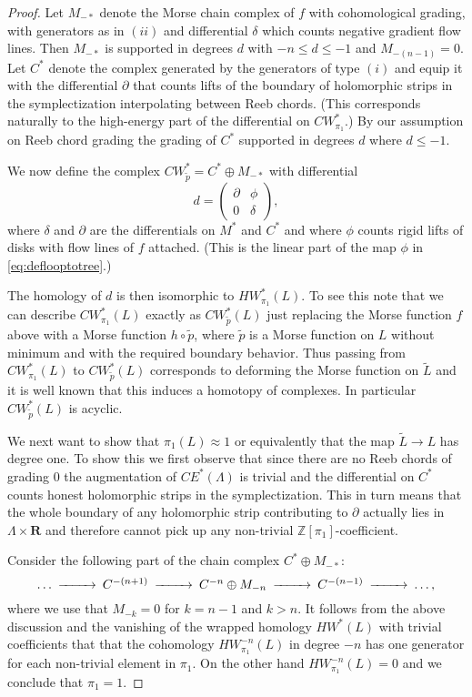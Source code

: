 \documentclass{gtpart}
\renewcommand{\Z}{\mathbb{Z}}
\renewcommand{\R}{\mathbf{R}}
\begin{document}
\begin{proof}
    Let $M_{-\ast}$ denote the Morse chain complex of $f$ with cohomological grading, with generators as in $(ii)$ and  differential $\delta$ which counts negative gradient flow lines. Then $M_{-\ast}$ is supported in degrees $d$ with $-n\le d\le -1$ and $M_{-(n-1)}=0$. Let $C^{\ast}$ denote the complex generated by the generators of type $(i)$ and equip it with the differential $\partial$ that counts lifts of the boundary of holomorphic strips in the symplectization interpolating between Reeb chords. (This corresponds naturally to the high-energy part of the differential on $CW^{\ast}_{\pi_{1}}$.) 
    By our assumption on Reeb chord grading the grading of $C^{\ast}$ supported in degrees $d$ where $d\le -1$.
	
	We now define the complex $CW^{\ast}_{\tilde p}=C^{\ast}\oplus M_{-\ast}$ with differential
	\[ 
	d=\left(
	\begin{matrix}
	\partial & \phi \\
	0 & \delta
	\end{matrix}
	\right),
	\]
	where $\delta$ and $\partial$ are the differentials on $M^{\ast}$ and $C^{\ast}$ and where $\phi$ counts rigid lifts of disks with flow lines of $f$ attached. (This is the linear part of the map $\phi$ in \eqref{eq:deflooptotree}.) 
	
	The homology of $d$ is then isomorphic to $HW_{\pi_{1}}^{\ast}(L)$. To see this note that we can describe $CW^{\ast}_{\pi_{1}}(L)$ exactly as $CW^{\ast}_{\tilde p}(L)$ just replacing the Morse function $f$ above with a Morse function $h\circ \tilde p$, where $\tilde p$ is a Morse function on $L$ without minimum and with the required boundary behavior. Thus passing from $CW^{\ast}_{\pi_{1}}(L)$ to $CW^{\ast}_{\tilde{p}}(L)$ corresponds to deforming the Morse function on $\tilde L$ and it is well known that this induces a homotopy of complexes.  
    In particular $CW^{\ast}_{\tilde p}(L)$ is acyclic.
	
	We next want to show that $\pi_{1}(L)\approx 1$ or equivalently that the map $\tilde L\to L$ has
    degree one. To show this we first observe that since there are no Reeb chords of grading $0$ the
    augmentation of $CE^*(\Lambda)$ is trivial and the differential on $C^{\ast}$ counts honest holomorphic strips in the symplectization. This in turn means that the whole boundary of any holomorphic strip contributing to $\partial$ actually lies in $\Lambda\times\R$ and therefore cannot pick up any non-trivial $\Z[\pi_1]$-coefficient.
	
	Consider the following part of the chain complex $C^{\ast}\oplus M_{-\ast}$:
	\[ 
	\begin{CD}
	\dots @>>> C^{-(n+1)} @>>> C^{-n}\oplus M_{-n} @>>> C^{-(n-1)} @>>> \dots,
	\end{CD}
	\]
	where we use that $M_{-k}=0$ for $k=n-1$ and $k>n$. It follows from the above discussion and the vanishing of the wrapped homology $HW^{\ast}(L)$ with trivial coefficients that that the cohomology $HW^{-n}_{\pi_{1}}(L)$ in degree $-n$ has one generator for each non-trivial element in $\pi_1$. On the other hand $HW^{-n}_{\pi_{1}}(L)=0$ and we conclude that $\pi_1=1$.
	

\end{proof}
\end{document}
